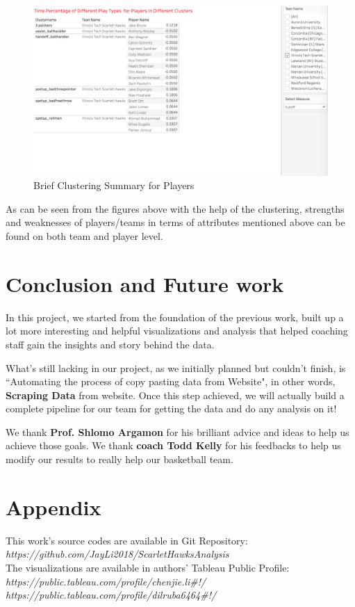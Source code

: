 \documentclass[conference]{IEEEtran}
\begin{document}
\begin{figure}[H]   
  \begin{center}
    \includegraphics[scale=0.5]{Picture5.jpg}
    \caption{Brief Clustering Summary for Players}\label{Saturation}
  \end{center}
\end{figure}
As can be seen from the figures above with the help of the clustering, strengths and weaknesses of players/teams in terms of  attributes mentioned above can be found  on both team and player level.

\section{Conclusion and Future work}
In this project, we started from the foundation of the previous work, built up a lot more interesting and helpful visualizations and analysis that helped coaching staff gain the insights and story behind the data.

What's still lacking in our project, as we initially planned but couldn't finish, is ``Automating the process of copy pasting data from Website", in other words, {\bf Scraping Data} from website. Once this step achieved, we will actually build a complete pipeline for our team for getting the data and do any analysis on it!

We thank {\bf Prof. Shlomo Argamon} for his brilliant advice and ideas to help us achieve those goals. We thank {\bf coach Todd Kelly} for his feedbacks to help us modify our results to really help our basketball team.

\section{Appendix}
This work's source codes are available in Git Repository:\\{\it https://github.com/JayLi2018/ScarletHawksAnalysis}\\

The visualizations are available in authors' Tableau Public Profile:\\
{\it https://public.tableau.com/profile/chenjie.li\#!/}\\
{\it https://public.tableau.com/profile/dilruba6464\#!/}\\




\end{document}
